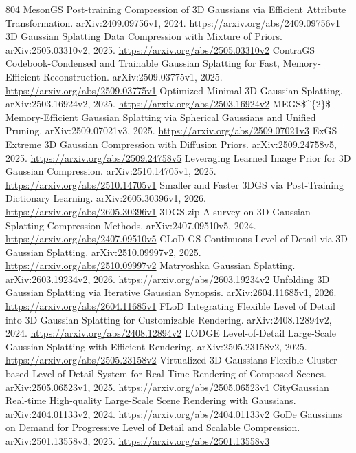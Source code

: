 \documentclass[11pt]{article}
\begin{document}
\begin{thebibliography}{804}
 MesonGS Post-training Compression of 3D Gaussians via Efficient Attribute Transformation. arXiv:2409.09756v1, 2024. \url{https://arxiv.org/abs/2409.09756v1}
 3D Gaussian Splatting Data Compression with Mixture of Priors. arXiv:2505.03310v2, 2025. \url{https://arxiv.org/abs/2505.03310v2}
 ContraGS Codebook-Condensed and Trainable Gaussian Splatting for Fast, Memory-Efficient Reconstruction. arXiv:2509.03775v1, 2025. \url{https://arxiv.org/abs/2509.03775v1}
 Optimized Minimal 3D Gaussian Splatting. arXiv:2503.16924v2, 2025. \url{https://arxiv.org/abs/2503.16924v2}
 MEGS\$\textasciicircum{}\{2\}\$ Memory-Efficient Gaussian Splatting via Spherical Gaussians and Unified Pruning. arXiv:2509.07021v3, 2025. \url{https://arxiv.org/abs/2509.07021v3}
 ExGS Extreme 3D Gaussian Compression with Diffusion Priors. arXiv:2509.24758v5, 2025. \url{https://arxiv.org/abs/2509.24758v5}
 Leveraging Learned Image Prior for 3D Gaussian Compression. arXiv:2510.14705v1, 2025. \url{https://arxiv.org/abs/2510.14705v1}
 Smaller and Faster 3DGS via Post-Training Dictionary Learning. arXiv:2605.30396v1, 2026. \url{https://arxiv.org/abs/2605.30396v1}
 3DGS.zip A survey on 3D Gaussian Splatting Compression Methods. arXiv:2407.09510v5, 2024. \url{https://arxiv.org/abs/2407.09510v5}
 CLoD-GS Continuous Level-of-Detail via 3D Gaussian Splatting. arXiv:2510.09997v2, 2025. \url{https://arxiv.org/abs/2510.09997v2}
 Matryoshka Gaussian Splatting. arXiv:2603.19234v2, 2026. \url{https://arxiv.org/abs/2603.19234v2}
 Unfolding 3D Gaussian Splatting via Iterative Gaussian Synopsis. arXiv:2604.11685v1, 2026. \url{https://arxiv.org/abs/2604.11685v1}
 FLoD Integrating Flexible Level of Detail into 3D Gaussian Splatting for Customizable Rendering. arXiv:2408.12894v2, 2024. \url{https://arxiv.org/abs/2408.12894v2}
 LODGE Level-of-Detail Large-Scale Gaussian Splatting with Efficient Rendering. arXiv:2505.23158v2, 2025. \url{https://arxiv.org/abs/2505.23158v2}
 Virtualized 3D Gaussians Flexible Cluster-based Level-of-Detail System for Real-Time Rendering of Composed Scenes. arXiv:2505.06523v1, 2025. \url{https://arxiv.org/abs/2505.06523v1}
 CityGaussian Real-time High-quality Large-Scale Scene Rendering with Gaussians. arXiv:2404.01133v2, 2024. \url{https://arxiv.org/abs/2404.01133v2}
 GoDe Gaussians on Demand for Progressive Level of Detail and Scalable Compression. arXiv:2501.13558v3, 2025. \url{https://arxiv.org/abs/2501.13558v3}

\end{thebibliography}
\end{document}
